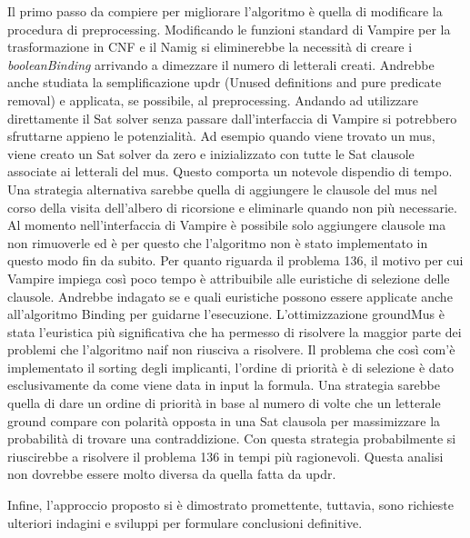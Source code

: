 \documentclass[./main.tex]{subfiles}
\begin{document}
Il primo passo da compiere per migliorare l'algoritmo è quella di modificare la procedura di preprocessing.
Modificando le funzioni standard di Vampire per la trasformazione in CNF e il Namig si
eliminerebbe la necessità di creare i \textit{booleanBinding} arrivando a dimezzare il numero di letterali creati.
Andrebbe anche studiata la semplificazione updr (Unused definitions and pure predicate removal) e 
applicata, se possibile, al preprocessing.
Andando ad utilizzare direttamente il Sat solver senza passare dall'interfaccia di Vampire 
si potrebbero sfruttarne appieno le potenzialità. 
Ad esempio quando viene trovato un mus, viene creato un Sat solver da zero e inizializzato con tutte le Sat clausole associate ai letterali del mus.
Questo comporta un notevole dispendio di tempo. 
Una strategia alternativa sarebbe quella di aggiungere le clausole del mus nel corso della visita dell'albero di ricorsione 
e eliminarle quando non più necessarie. 
Al momento nell'interfaccia di Vampire è possibile solo aggiungere clausole ma non rimuoverle ed 
è per questo che l'algoritmo non è stato implementato in questo modo fin da subito.
Per quanto riguarda il problema 136, il motivo per cui Vampire impiega così poco tempo 
è attribuibile alle euristiche di selezione delle clausole. 
Andrebbe indagato se e quali euristiche possono essere applicate anche all'algoritmo Binding per guidarne l'esecuzione.
L'ottimizzazione groundMus è stata l'euristica più significativa che ha permesso di risolvere la maggior parte dei problemi
che l'algoritmo naif non riusciva a risolvere.
Il problema che così com'è implementato il sorting degli implicanti, l'ordine di priorità è di selezione è dato esclusivamente da come 
viene data in input la formula. 
Una strategia sarebbe quella di dare un ordine di priorità in base al numero di volte che un letterale ground compare
con polarità opposta in una Sat clausola per massimizzare la probabilità di trovare una contraddizione.
Con questa strategia probabilmente si riuscirebbe a risolvere il problema 136 in tempi più ragionevoli.
Questa analisi non dovrebbe essere molto diversa da quella fatta da updr.

Infine, l'approccio proposto si è dimostrato promettente, 
tuttavia, sono richieste ulteriori indagini e sviluppi per formulare conclusioni definitive.
\end{document}
